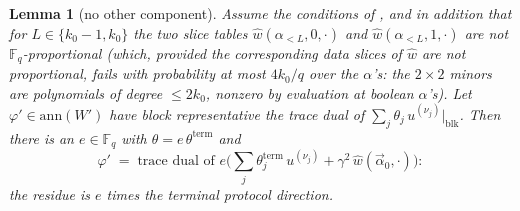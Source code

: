 \documentclass{article}
\newcommand{\Fq}{\mathbb{F}_q}
\newtheorem{lemma}[theorem]{Lemma}
\theoremstyle{definition}
\begin{document}
\begin{lemma}[no other component]\label{lem:noother}
Assume the conditions of , and in addition that for $L \in \{k_0 - 1, k_0\}$ the two slice tables $\hat{w}(\alpha_{<L}, 0, \cdot)$ and $\hat{w}(\alpha_{<L}, 1, \cdot)$ are not $\Fq$-proportional (which, provided the corresponding \emph{data} slices of $\hat{w}$ are not proportional, fails with probability at most $4 k_0/q$ over the $\alpha$'s: the $2 \times 2$ minors are polynomials of degree $\leq 2k_0$, nonzero by evaluation at boolean $\alpha$'s). Let $\varphi' \in \mathrm{ann}(W')$ have block representative the trace dual of $\sum_j \theta_j\, u^{(\nu_j)}|_{\mathrm{blk}}$. Then there is an $e \in \Fq$ with $\theta = e\, \theta^{\mathrm{term}}$ and
\[
\varphi' \;=\; \text{trace dual of } e \Big( \sum_j \theta^{\mathrm{term}}_j\, u^{(\nu_j)} + \gamma^2\, \hat{w}(\vec{\alpha}_0, \cdot) \Big) :
\]
the residue is $e$ times the terminal protocol direction.
\end{lemma}
\end{document}
